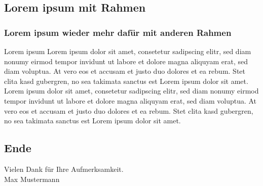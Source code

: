 \documentclass[xcolor=dvipsnames]{beamer}
\newcommand*{\Author}{Max Mustermann} %
\begin{document}
\subsection{Lorem ipsum mit Rahmen}
\begin{frame}
  \frametitle{Lorem ipsum wieder mehr dafür mit anderen Rahmen}
  \begin{alertblock}{Lorem ipsum}
  Lorem ipsum dolor sit amet, consetetur sadipscing elitr, sed diam nonumy eirmod tempor invidunt ut labore et dolore magna aliquyam erat, sed diam voluptua. At vero eos et accusam et justo duo dolores et ea rebum. Stet clita kasd gubergren, no sea takimata sanctus est Lorem ipsum dolor sit amet. Lorem ipsum dolor sit amet, consetetur sadipscing elitr, sed diam nonumy eirmod tempor invidunt ut labore et dolore magna aliquyam erat, sed diam voluptua. At vero eos et accusam et justo duo dolores et ea rebum. Stet clita kasd gubergren, no sea takimata sanctus est Lorem ipsum dolor sit amet.
  \end{alertblock}
\end{frame}

\subsection*{Ende}
\begin{frame}
	\begin{block}{}	
		\begin{center}
			Vielen Dank für Ihre Aufmerksamkeit. \\
			\Author{}
		\end{center}	
	\end{block}
\end{frame}
\end{document}
